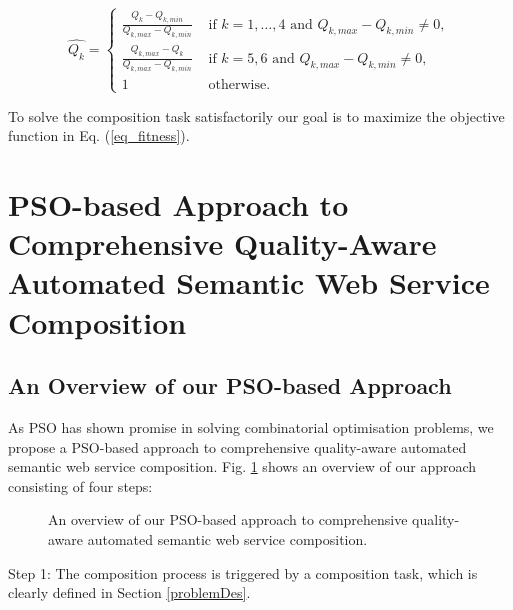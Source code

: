 \documentclass{llncs}
\begin{document}
\begin{equation}
\label{eq_normal}
\hat{Q_k} = 
\begin{cases}
	\frac{Q_k - Q_{k, min}}{Q_{k, max} - Q_{k, min}} & \text{ if $k=1,\ldots,4$ and }Q_{k, max} - Q_{k, min} \neq 0,\\
	\frac{Q_{k,max} - Q_k}{Q_{k, max} - Q_{k, min}} & \text{ if $k=5,6$ and }Q_{k, max} - Q_{k, min} \neq 0,\\
	1 & \text{ otherwise}.
\end{cases}
\end{equation}

\noindent To solve the composition task satisfactorily our goal is to maximize the objective function in Eq. (\ref{eq_fitness}).


\section{PSO-based Approach to Comprehensive Quality-Aware Automated Semantic Web Service Composition}\label{qswsc_approach}
\subsection{An Overview of our PSO-based Approach}\label{PSO_based_approach}
As PSO has shown promise in solving combinatorial optimisation problems, we propose a PSO-based approach to comprehensive quality-aware automated semantic web service composition. Fig. \ref{overview} shows an overview of our approach consisting of four steps: 
\begin{figure}[h]
\centering
{}
 \caption{An overview of our PSO-based approach to comprehensive quality-aware automated semantic web service composition.}
 \label{overview}
\end{figure}
\vspace{-0.5cm}

Step 1: The composition process is triggered by a composition task, which is clearly defined in Section \ref{problemDes}. 
\end{document}
